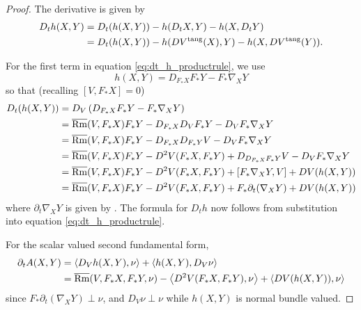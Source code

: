 \begin{proof}
The derivative is given by
\begin{equation}
\label{eq:dt_h_productrule}
\begin{split}
D_t h (X, Y) &= D_t (h(X, Y)) - h(D_t X, Y) - h(X, D_t Y) \\
&= D_t (h(X, Y)) - h(DV^{\operatorname{tang}}(X), Y) - h(X, DV^{\operatorname{tang}}(Y)).
\end{split}
\end{equation}

For the first term in equation \eqref{eq:dt_h_productrule}, we use
\[
h(X, Y) = D_{F_{\ast} X} F_{\ast} Y - F_{\ast} \nabla_X Y
\]
so that (recalling \([V, F_{\ast} X] = 0\))
\[
\begin{split}
D_t (h(X, Y)) &= D_V \left(D_{F_{\ast} X} F_{\ast} Y - F_{\ast} \nabla_X Y\right) \\
&= \overline{\operatorname{Rm}} (V, F_{\ast} X) F_{\ast} Y - D_{F_{\ast} X} D_V F_{\ast} Y - D_V F_{\ast} \nabla_X Y \\
&= \overline{\operatorname{Rm}} (V, F_{\ast} X) F_{\ast} Y - D_{F_{\ast} X} D_{F_{\ast} Y} V - D_V F_{\ast} \nabla_X Y \\
&= \overline{\operatorname{Rm}} (V, F_{\ast} X) F_{\ast} Y - D^2 V(F_{\ast} X, F_{\ast} Y) + D_{D_{F_{\ast} X} F_{\ast} Y} V - D_V F_{\ast} \nabla_X Y \\
&= \overline{\operatorname{Rm}} (V, F_{\ast} X) F_{\ast} Y - D^2 V(F_{\ast} X, F_{\ast} Y) + [F_{\ast} \nabla_X Y, V] + DV (h(X, Y)) \\
&= \overline{\operatorname{Rm}} (V, F_{\ast} X) F_{\ast} Y - D^2 V(F_{\ast} X, F_{\ast} Y) + F_{\ast} \partial_t (\nabla_X Y) + DV (h(X, Y))
\end{split}
\]
where \(\partial_t \nabla_X Y\) is given by . The formula for \(D_t h\) now follows from substitution into equation \eqref{eq:dt_h_productrule}.

For the scalar valued second fundamental form,
\[
\begin{split}
\partial_t A(X, Y) &= \left\langle D_V h(X, Y),\nu \right\rangle + \left\langle h(X, Y),D_V \nu \right\rangle \\
&= \overline{\operatorname{Rm}} (V, F_{\ast} X, F_{\ast} Y, \nu) - \left\langle D^2 V(F_{\ast} X, F_{\ast} Y),\nu \right\rangle + \left\langle DV (h(X, Y)),\nu \right\rangle
\end{split}
\]
since \(F_{\ast} \partial_t (\nabla_X Y) \perp \nu\), and \(D_V \nu \perp \nu\) while \(h(X, Y)\) is normal bundle valued.
\end{proof}
